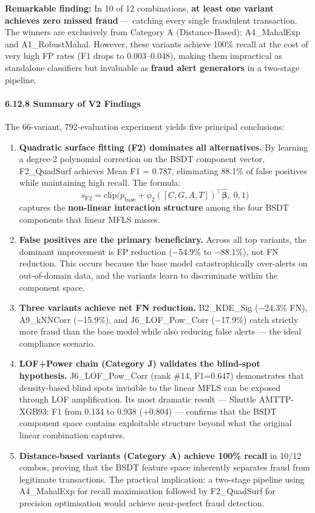 \documentclass[
  11pt,
]{article}
\begin{document}
\textbf{Remarkable finding:} In 10 of 12 combinations, \textbf{at least
one variant achieves zero missed fraud} — catching every single
fraudulent transaction. The winners are exclusively from Category A
(Distance-Based): A4\_MahalExp and A1\_RobustMahal. However, these
variants achieve 100\% recall at the cost of very high FP rates (F1
drops to 0.003–0.048), making them impractical as standalone classifiers
but invaluable as \textbf{fraud alert generators} in a two-stage
pipeline.

\paragraph{6.12.8 Summary of V2 Findings}\label{summary-of-v2-findings}

The 66-variant, 792-evaluation experiment yields five principal
conclusions:

\begin{enumerate}
\def\labelenumi{\arabic{enumi}.}
\item
  \textbf{Quadratic surface fitting (F2) dominates all alternatives.} By
  learning a degree-2 polynomial correction on the BSDT component
  vector, F2\_QuadSurf achieves Mean F1 = 0.787, eliminating 88.1\% of
  false positives while maintaining high recall. The formula:
  \[s_{\text{F2}} = \text{clip}\big(p_{\text{base}} + \phi_2([C,G,A,T])^\top\hat{\boldsymbol{\beta}},\; 0, 1\big)\]
  captures the \textbf{non-linear interaction structure} among the four
  BSDT components that linear MFLS misses.
\item
  \textbf{False positives are the primary beneficiary.} Across all top
  variants, the dominant improvement is FP reduction (−54.9\% to
  −88.1\%), not FN reduction. This occurs because the base model
  catastrophically over-alerts on out-of-domain data, and the variants
  learn to discriminate within the component space.
\item
  \textbf{Three variants achieve net FN reduction.} B2\_KDE\_Sig
  (−24.3\% FN), A9\_kNNCorr (−15.9\%), and J6\_LOF\_Pow\_Corr (−17.9\%)
  catch strictly more fraud than the base model while also reducing
  false alerts — the ideal compliance scenario.
\item
  \textbf{LOF+Power chain (Category J) validates the blind-spot
  hypothesis.} J6\_LOF\_Pow\_Corr (rank \#14, F1=0.647) demonstrates
  that density-based blind spots invisible to the linear MFLS can be
  exposed through LOF amplification. Its most dramatic result — Shuttle
  AMTTP-XGB93: F1 from 0.134 to 0.938 (+0.804) — confirms that the BSDT
  component space contains exploitable structure beyond what the
  original linear combination captures.
\item
  \textbf{Distance-based variants (Category A) achieve 100\% recall} in
  10/12 combos, proving that the BSDT feature space inherently separates
  fraud from legitimate transactions. The practical implication: a
  two-stage pipeline using A4\_MahalExp for recall maximisation followed
  by F2\_QuadSurf for precision optimisation would achieve near-perfect
  fraud detection.
\end{enumerate}
\end{document}
